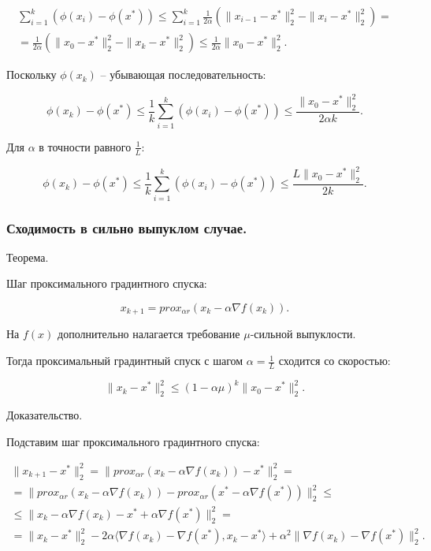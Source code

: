 \begin{equation}
\begin{aligned}
    \sum\limits_{i=1}^k(\phi(x_i)-\phi(x^*))\leq
    \sum\limits_{i=1}^k\frac1{2\alpha}\left(\|x_{i-1}-x^*\|_2^2-\|x_i-x^*\|_2^2\right)=\\=
    \frac1{2\alpha}\left(\|x_0-x^*\|_2^2-\|x_k-x^*\|_2^2\right)\leq
    \frac1{2\alpha}\|x_0-x^*\|_2^2.
\end{aligned}
\end{equation}

Поскольку $\phi(x_k)$ -- убывающая последовательность:

\begin{equation}
    \phi(x_k)-\phi(x^*)\leq
    \frac1k\sum\limits_{i=1}^k(\phi(x_i)-\phi(x^*))\leq
    \frac{\|x_0-x^*\|_2^2}{2\alpha k}.
\end{equation}

Для $\alpha$ в точности равного $\frac1L$:

\begin{equation}
    \phi(x_k)-\phi(x^*)\leq
    \frac1k\sum\limits_{i=1}^k(\phi(x_i)-\phi(x^*))\leq
    \frac{L\|x_0-x^*\|_2^2}{2k}.
\end{equation}

\subsubsection*{Сходимость в сильно выпуклом случае.}

Теорема.

Шаг проксимального градинтного спуска:

\begin{equation}
    x_{k+1}=prox_{\alpha r}(x_k-\alpha\nabla f(x_k)).
\end{equation}

На $f(x)$ дополнительно налагается требование $\mu$-сильной выпуклости.

Тогда проксимальный градинтный спуск с шагом $\alpha=\frac1L$ сходится со скоростью:

\begin{equation}
    \|x_k-x^*\|_2^2\leq(1-\alpha\mu)^k\|x_0-x^*\|_2^2.
\end{equation}

Доказательство.

Подставим шаг проксимального градинтного спуска:

\begin{equation}
\begin{aligned}
    \|x_{k+1}-x^*\|_2^2=
    \|prox_{\alpha r}(x_k-\alpha\nabla f(x_k))-x^*\|_2^2=\\=
    \|prox_{\alpha r}(x_k-\alpha\nabla f(x_k))-
    prox_{\alpha r}(x^*-\alpha\nabla f(x^*))\|_2^2\leq\\\leq
    \|x_k-\alpha\nabla f(x_k)-x^*+\alpha\nabla f(x^*)\|_2^2=\\=
    \|x_k-x^*\|_2^2-
    2\alpha\langle\nabla f(x_k)-\nabla f(x^*),x_k-x^*\rangle+
    \alpha^2\|\nabla f(x_k)-\nabla f(x^*)\|_2^2.
\end{aligned}
\end{equation}

